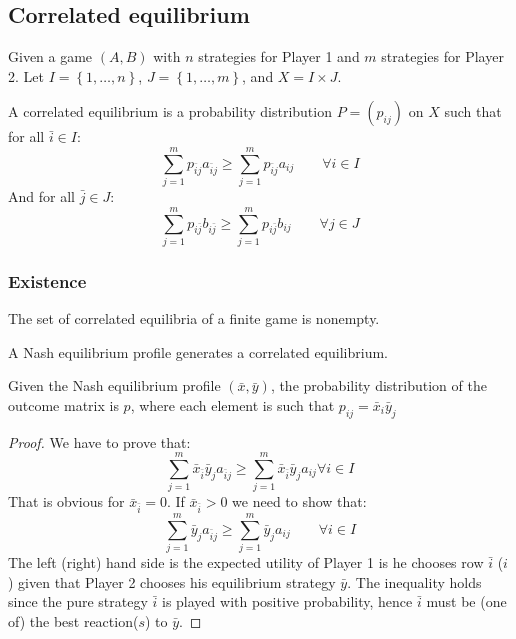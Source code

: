 \subsection{Correlated equilibrium}
Given a game $(A,B)$ with $n$ strategies for Player 1 and $m$ strategies for Player 2. 
Let $I=\left\{1,\dots,n\right\}$, $J=\left\{1,\dots,m\right\}$, and $X=I\times J$. 
\begin{definition}
    A correlated equilibrium is a probability distribution $P=(p_{ij})$ on $X$ such that for all $\bar{i}\in I$: 
    \[\sum_{j=1}^{m}p_{\bar{i}j}a_{\bar{i}j}\geq\sum_{j=1}^{m}p_{\bar{i}j}a_{ij}\qquad \forall i\in I\]
    And for all $\bar{j}\in J$: 
    \[\sum_{j=1}^{m}p_{i\bar{j}}b_{i\bar{j}}\geq\sum_{j=1}^{m}p_{i\bar{j}}b_{ij}\qquad \forall j\in J\]
\end{definition}

\subsubsection{Existence}
The set of correlated equilibria of a finite game is nonempty. 
\begin{theorem}
    A Nash equilibrium profile generates a correlated equilibrium. 
\end{theorem}
\noindent Given the Nash equilibrium profile $(\bar{x},\bar{y})$, the probability distribution of the outcome matrix is $p$, where each element is such that $p_{ij}=\bar{x}_i\bar{y}_j$
\begin{proof}
    We have to prove that: 
    \[\sum_{j=1}^{m}\bar{x}_{\bar{i}}\bar{y}_ja_{\bar{i}j}\geq \sum_{j=1}^{m}\bar{x}_{\bar{i}}\bar{y}_ja_{ij}\forall i \in I\]
    That is obvious for $\bar{x}_{\bar{i}}=0$. 
    If $\bar{x}_{\bar{i}}>0$ we need to show that: 
    \[\sum_{j=1}^{m}\bar{y}_{j}a_{\bar{i}j}\geq\sum_{j=1}^{m}\bar{y}_{j}a_{ij}\qquad \forall i\in I\]
    The left (right) hand side is the expected utility of Player 1 is he chooses row $\bar{i}$ ($i$) given that Player 2 chooses his equilibrium strategy $\bar{y}$. 
    The inequality holds since the pure strategy $\bar{i}$ is played with positive probability, hence $\bar{i}$ must be (one of) the best reaction($s$) to $\bar{y}$. 
\end{proof}

